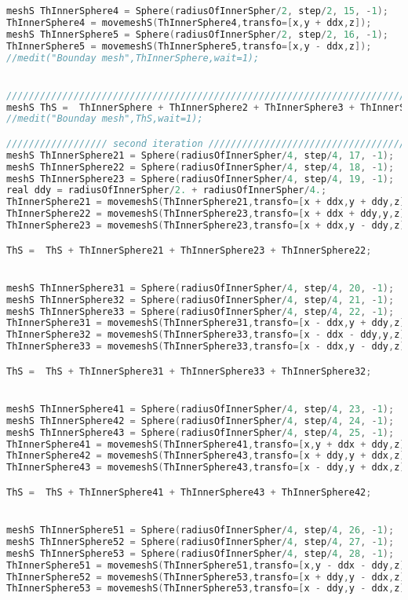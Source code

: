 \begin{lstlisting}[language=C]
meshS ThInnerSphere4 = Sphere(radiusOfInnerSpher/2, step/2, 15, -1);
ThInnerSphere4 = movemeshS(ThInnerSphere4,transfo=[x,y + ddx,z]);
meshS ThInnerSphere5 = Sphere(radiusOfInnerSpher/2, step/2, 16, -1);
ThInnerSphere5 = movemeshS(ThInnerSphere5,transfo=[x,y - ddx,z]);
//medit("Bounday mesh",ThInnerSphere,wait=1);


/////////////////////////////////////////////////////////////////////////////
meshS ThS =  ThInnerSphere + ThInnerSphere2 + ThInnerSphere3 + ThInnerSphere4 + ThInnerSphere5;
//medit("Bounday mesh",ThS,wait=1);

////////////////// second iteration //////////////////////////////////////////////////////////
meshS ThInnerSphere21 = Sphere(radiusOfInnerSpher/4, step/4, 17, -1);
meshS ThInnerSphere22 = Sphere(radiusOfInnerSpher/4, step/4, 18, -1);
meshS ThInnerSphere23 = Sphere(radiusOfInnerSpher/4, step/4, 19, -1);
real ddy = radiusOfInnerSpher/2. + radiusOfInnerSpher/4.;
ThInnerSphere21 = movemeshS(ThInnerSphere21,transfo=[x + ddx,y + ddy,z]);
ThInnerSphere22 = movemeshS(ThInnerSphere23,transfo=[x + ddx + ddy,y,z]);
ThInnerSphere23 = movemeshS(ThInnerSphere23,transfo=[x + ddx,y - ddy,z]);

ThS =  ThS + ThInnerSphere21 + ThInnerSphere23 + ThInnerSphere22;


meshS ThInnerSphere31 = Sphere(radiusOfInnerSpher/4, step/4, 20, -1);
meshS ThInnerSphere32 = Sphere(radiusOfInnerSpher/4, step/4, 21, -1);
meshS ThInnerSphere33 = Sphere(radiusOfInnerSpher/4, step/4, 22, -1);
ThInnerSphere31 = movemeshS(ThInnerSphere31,transfo=[x - ddx,y + ddy,z]);
ThInnerSphere32 = movemeshS(ThInnerSphere33,transfo=[x - ddx - ddy,y,z]);
ThInnerSphere33 = movemeshS(ThInnerSphere33,transfo=[x - ddx,y - ddy,z]);

ThS =  ThS + ThInnerSphere31 + ThInnerSphere33 + ThInnerSphere32;


meshS ThInnerSphere41 = Sphere(radiusOfInnerSpher/4, step/4, 23, -1);
meshS ThInnerSphere42 = Sphere(radiusOfInnerSpher/4, step/4, 24, -1);
meshS ThInnerSphere43 = Sphere(radiusOfInnerSpher/4, step/4, 25, -1);
ThInnerSphere41 = movemeshS(ThInnerSphere41,transfo=[x,y + ddx + ddy,z]);
ThInnerSphere42 = movemeshS(ThInnerSphere43,transfo=[x + ddy,y + ddx,z]);
ThInnerSphere43 = movemeshS(ThInnerSphere43,transfo=[x - ddy,y + ddx,z]);

ThS =  ThS + ThInnerSphere41 + ThInnerSphere43 + ThInnerSphere42;


meshS ThInnerSphere51 = Sphere(radiusOfInnerSpher/4, step/4, 26, -1);
meshS ThInnerSphere52 = Sphere(radiusOfInnerSpher/4, step/4, 27, -1);
meshS ThInnerSphere53 = Sphere(radiusOfInnerSpher/4, step/4, 28, -1);
ThInnerSphere51 = movemeshS(ThInnerSphere51,transfo=[x,y - ddx - ddy,z]);
ThInnerSphere52 = movemeshS(ThInnerSphere53,transfo=[x + ddy,y - ddx,z]);
ThInnerSphere53 = movemeshS(ThInnerSphere53,transfo=[x - ddy,y - ddx,z]);


\end{lstlisting}
